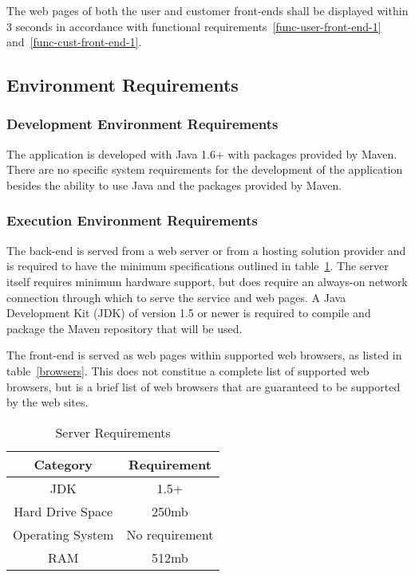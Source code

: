 \documentclass{article}
\begin{document}
The web pages of both the user and customer front-ends shall be displayed within
3 seconds in accordance with functional requirements~\ref{func-user-front-end-1}
and~\ref{func-cust-front-end-1}.

\pagebreak
\subsection{Environment Requirements}

\subsubsection{Development Environment Requirements}

The application is developed with Java 1.6+ with packages provided by
Maven.  There are no specific system requirements for the development of
the application besides the ability to use Java and the packages provided
by Maven.

\subsubsection{Execution Environment Requirements}

The back-end is served from a web server or from a hosting solution provider and is
required to have the minimum specifications outlined in table~\ref{server}.  The
server itself requires minimum hardware support, but does require an always-on
network connection through which to serve the service and web pages.  A Java
Development Kit (JDK) of version 1.5 or newer is required to compile and package
the Maven repository that will be used.

The front-end is served as web pages within supported web browsers, as listed in
table~\ref{browsers}.  This does not constitue a complete list of supported web
browsers, but is a brief list of web browsers that are guaranteed to be supported
by the web sites.

\begin{table}
    \centering
    \begin{tabular}{|c|c|}\hline
        Category & Requirement \\\hline\hline
        JDK & 1.5+ \\\hline
        Hard Drive Space & 250mb \\\hline
        Operating System & No requirement \\\hline
        RAM & 512mb \\\hline
    \end{tabular}
    \caption{Server Requirements}
    \label{server}
\end{table}
\end{document}
